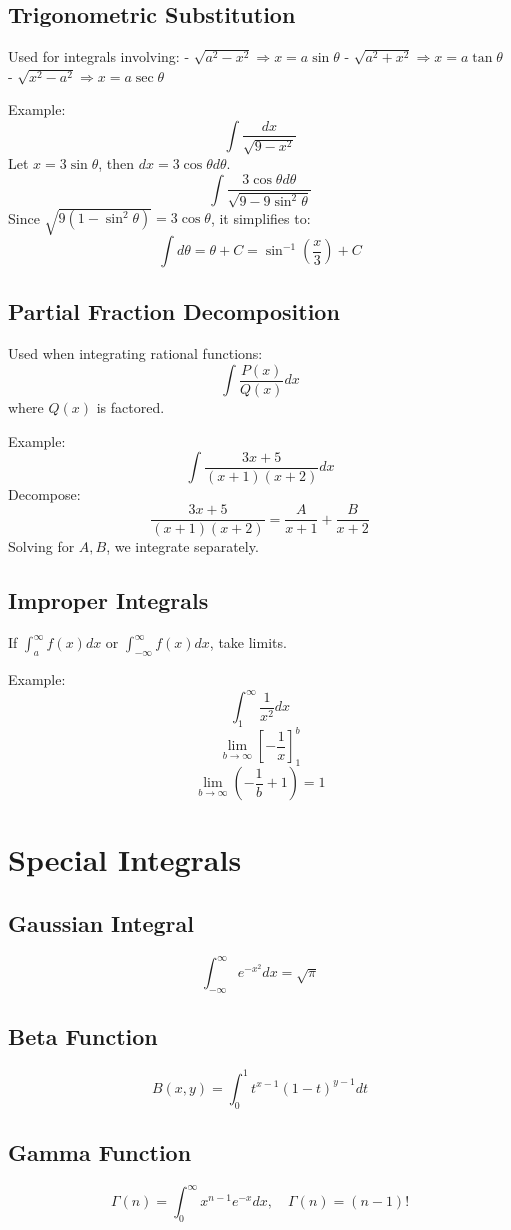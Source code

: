 \documentclass{article}
\begin{document}
\subsection{Trigonometric Substitution}
Used for integrals involving:
- \( \sqrt{a^2 - x^2} \Rightarrow x = a \sin \theta \)
- \( \sqrt{a^2 + x^2} \Rightarrow x = a \tan \theta \)
- \( \sqrt{x^2 - a^2} \Rightarrow x = a \sec \theta \)

Example:
\[
\int \frac{dx}{\sqrt{9 - x^2}}
\]
Let \( x = 3 \sin \theta \), then \( dx = 3 \cos \theta d\theta \).
\[
\int \frac{3 \cos \theta d\theta}{\sqrt{9 - 9\sin^2 \theta}}
\]
Since \( \sqrt{9(1 - \sin^2 \theta)} = 3 \cos \theta \), it simplifies to:
\[
\int d\theta = \theta + C = \sin^{-1} \left(\frac{x}{3} \right) + C
\]

\subsection{Partial Fraction Decomposition}
Used when integrating rational functions:
\[
\int \frac{P(x)}{Q(x)} dx
\]
where \( Q(x) \) is factored.

Example:
\[
\int \frac{3x+5}{(x+1)(x+2)} dx
\]
Decompose:
\[
\frac{3x+5}{(x+1)(x+2)} = \frac{A}{x+1} + \frac{B}{x+2}
\]
Solving for \( A, B \), we integrate separately.

\subsection{Improper Integrals}
If \( \int_a^\infty f(x) dx \) or \( \int_{-\infty}^{\infty} f(x) dx \), take limits.

Example:
\[
\int_1^\infty \frac{1}{x^2} dx
\]
\[
\lim_{b \to \infty} \left[ -\frac{1}{x} \right]_1^b
\]
\[
\lim_{b \to \infty} \left( -\frac{1}{b} + 1 \right) = 1
\]
\newpage
\section{Special Integrals}
\subsection{Gaussian Integral}
\[
\int_{-\infty}^{\infty} e^{-x^2} dx = \sqrt{\pi}
\]
\subsection{Beta Function}
\[
B(x,y) = \int_0^1 t^{x-1} (1-t)^{y-1} dt
\]
\subsection{Gamma Function}
\[
\Gamma(n) = \int_0^\infty x^{n-1} e^{-x} dx, \quad \Gamma(n) = (n-1)!
\]
\end{document}
